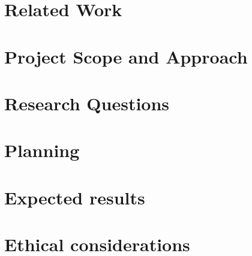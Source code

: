 \documentclass{article}
\begin{document}
\section{Related Work}


\section{Project Scope and Approach}


\section{Research Questions}


\section{Planning}


\section{Expected results}


\section{Ethical considerations}


\cite{capkun2006secure}

\cite{francillon2011relay}

\cite{vandenbreekel2014relay}


\printbibliography
\end{document}
